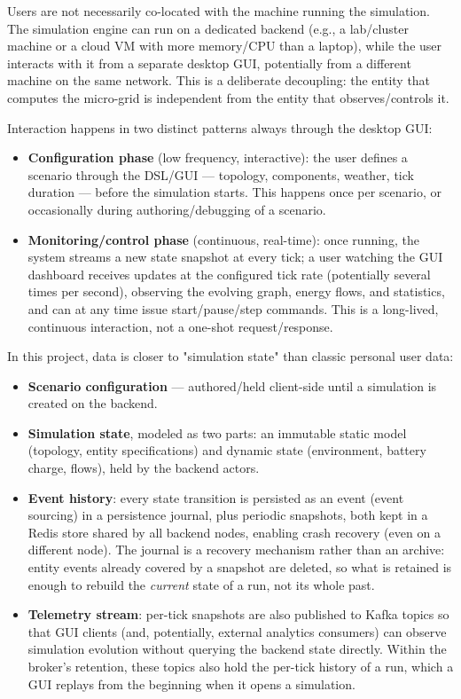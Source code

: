 \documentclass{scrreprt}
\begin{document}
Users are not necessarily co-located with the machine running the simulation. The
simulation engine can run on a dedicated backend (e.g., a lab/cluster machine or a cloud VM
with more memory/CPU than a laptop), while the user interacts with it from a separate
desktop GUI, potentially from a different machine on the same network. This is a deliberate decoupling: the entity that computes the micro-grid is independent from the entity that observes/controls it.

Interaction happens in two distinct patterns always through the desktop GUI:
\begin{itemize}
    \item \textbf{Configuration phase} (low frequency, interactive): the user defines a scenario through the
    DSL/GUI — topology, components, weather, tick duration — before the simulation starts.
    This happens once per scenario, or occasionally during authoring/debugging of a scenario.
    \item \textbf{Monitoring/control phase} (continuous, real-time): once running, the system streams a new
    state snapshot at every tick; a user watching the GUI dashboard receives updates at the
    configured tick rate (potentially several times per second), observing the evolving graph,
    energy flows, and statistics, and can at any time issue start/pause/step commands. This is
    a long-lived, continuous interaction, not a one-shot request/response.
\end{itemize}

In this project, data is closer to "simulation state" than classic personal user data:
\begin{itemize}
    \item  \textbf{Scenario configuration} — authored/held client-side until a simulation is created on the backend.
    \item \textbf{Simulation state}, modeled as two parts: an immutable static model (topology, entity
    specifications) and dynamic state (environment, battery charge, flows), held by the backend actors.
    \item \textbf{Event history}: every state transition is persisted as an event (event sourcing) in a
    persistence journal, plus periodic snapshots, both kept in a Redis store shared by all
    backend nodes, enabling crash recovery (even on a different node). The journal is a
    recovery mechanism rather than an archive: entity events already covered by a snapshot are
    deleted, so what is retained is enough to rebuild the \emph{current} state of a run, not
    its whole past.
    \item \textbf{Telemetry stream}: per-tick snapshots are also published to Kafka topics so that GUI
    clients (and, potentially, external analytics consumers) can observe simulation evolution
    without querying the backend state directly. Within the broker's retention, these topics
    also hold the per-tick history of a run, which a GUI replays from the beginning when it
    opens a simulation.
\end{itemize}
\end{document}
